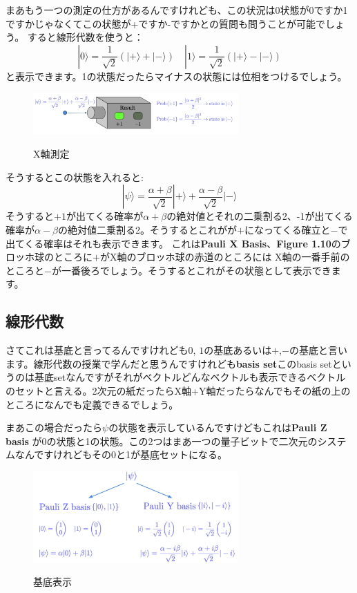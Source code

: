 まあもう一つの測定の仕方があるんですけれども、この状況は0状態が0ですか1ですかじゃなくてこの状態が+ですか-ですかとの質問も問うことが可能でしょう。
すると線形代数を使うと：
\begin{equation}
|0\rangle=\frac{1}{\sqrt{2}}(|+\rangle+|-\rangle) \quad|1\rangle=\frac{1}{\sqrt{2}}(|+\rangle-|-\rangle)
\end{equation}
と表示できます。1の状態だったらマイナスの状態には位相をつけるでしょう。
\begin{figure}[H]
    \centering
    \includegraphics[width=0.7\textwidth]{lesson2/Pauli_x_machine.pdf}
    \label{fig: 1}
    \begin{center}
        \caption{X軸測定}
    \end{center}
\end{figure}
そうするとこの状態を入れると:
\begin{equation}
|\psi\rangle=\frac{\alpha+\beta}{\sqrt{2}}|+\rangle+\frac{\alpha-\beta}{\sqrt{2}}|-\rangle
\end{equation}
そうすると$+1$が出てくる確率が$\alpha +\beta$の絶対値とそれの二乗割る2、-1が出てくる確率が$\alpha-\beta$の絶対値二乗割る2。そうするとこれがが$+$になってくる確立と$-$で出てくる確率はそれも表示できます。
これは\textbf{Pauli X Basis}、\textbf{Figure 1.10}のブロッホ球のところに$+$がX軸のブロッホ球の赤道のところには X軸の一番手前のところと$-$が一番後ろでしょう。そうするとこれがその状態として表示できます。
\subsection{線形代数}
さてこれは基底と言ってるんですけれども$0$, $1$の基底あるいは$+$,$-$の基底と言います。線形代数の授業で学んだと思うんですけれども\textbf{basis set}このbasis setというのは基底setなんですがそれがベクトルどんなベクトルも表示できるベクトルのセットと言える。2次元の紙だったらX軸+Y軸だったらなんでもその紙の上のところになんでも定義できるでしょう。

まあこの場合だったら$\psi$の状態を表示しているんですけどもこれは\textbf{Pauli Z basis} が0の状態と1の状態。この2つはまあ一つの量子ビットで二次元のシステムなんですけれどもその0と1が基底セットになる。
\begin{figure}[H]
    \centering
    \includegraphics[width=0.7\textwidth]{lesson2/basis_representation.pdf}
    \label{fig: 1}
    \begin{center}
        \caption{基底表示}
    \end{center}
\end{figure}

